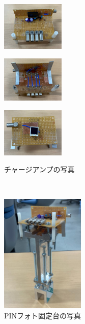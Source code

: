 \documentclass[a4paper,11pt,dvipdfmx]{jsarticle}
\begin{document}
  \begin{figure}[H]
   \begin{minipage}{0.32\linewidth}
    \centering
    \includegraphics[width=30mm]{picture/setup/omote.jpg}
    \label{omote}
   \end{minipage}
   \begin{minipage}{0.32\linewidth}
    \centering
    \includegraphics[width=30mm]{picture/setup/ura.jpg}
    \label{ura}
   \end{minipage}
   \begin{minipage}{0.32\linewidth}
    \centering
    \includegraphics[width=30mm]{picture/setup/sokumen.jpg}
    \label{sokumen}
   \end{minipage}
  \caption{チャージアンプの写真}
  \label{tya-jianpu}
\end{figure}

　\begin{figure}[H]
    \centering
    \includegraphics[width=40mm]{picture/setup/koteidai.jpg}
    \caption{PINフォト固定台の写真}
    \label{koteidai}
  \end{figure}
  
\end{document}
